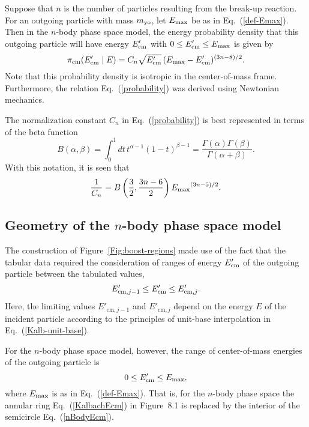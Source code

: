 Suppose that $n$ is the number of particles resulting from the break-up
reaction.  For an outgoing particle with mass $m_{\text{yo}}$,
let $E_{\text{max}}$ be as in Eq.~(\ref{def-Emax}).
Then in the $n$-body phase space model, the energy probability density 
that this outgoing particle will have energy $E_{\text{cm}}'$ with $0 \le E_{\text{cm}}' \le E_{\text{max}}$
is given by
\begin{equation}
  \pi_{\text{cm}}(E_{\text{cm}}' \mid E ) = C_n 
     \sqrt{E_{\text{cm}}'}\,
     (E_{\text{max}} - E_{\text{cm}}')^{(3n - 8)/2}.
  \label{probability}
\end{equation}
Note that this probability density is isotropic in the center-of-mass frame.
Furthermore, the relation Eq.~(\ref{probability}) was derived using Newtonian
mechanics.

The normalization constant $C_n$ in Eq.~(\ref{probability}) is best
represented in terms of the beta function
\begin{equation}
  B(\alpha, \beta) =
   \int_0^1 dt \, t^{\alpha - 1} (1 - t)^{\beta - 1} =
   \frac{\Gamma(\alpha) \Gamma(\beta)}{\Gamma( \alpha + \beta)}.
  \label{beta-func}
\end{equation}
With this notation, it is seen that
\begin{equation}
  \frac{1}{C_n} = B\left(\frac{3}{2}, \frac{3n - 6}{2} \right)
    {E_{\text{max}}}^{(3n - 5)/2}.
  \label{norm}
\end{equation}

\subsection{Geometry of the $n$-body phase space model}
The construction of Figure~\ref{Fig:boost-regions}
made use of the fact that the tabular data required the
consideration of ranges of energy $E_{\text{cm}}'$ of the outgoing particle
between the tabulated values,
\begin{equation}
  E'_{\text{cm},j-1} \le E_{\text{cm}}' \le E'_{\text{cm},j}.
  \label{KalbachEcm}
\end{equation}
Here, the limiting values $E'_{\text{cm},j-1}$ and $E'_{\text{cm},j}$
depend on the energy $E$ of the incident particle according to the
principles of unit-base interpolation in Eq.~(\ref{Kalb-unit-base}).

For the $n$-body phase space model, however, the range of
center-of-mass energies of the outgoing particle is
\begin{equation}
  0 \le E_{\text{cm}}' \le E_{\text{max}},
  \label{nBodyEcm}
\end{equation}
where $E_{\text{max}}$ is as in Eq.~(\ref{def-Emax}).  
That is, for the $n$-body phase space
the annular ring Eq.~(\ref{KalbachEcm}) in Figure~8.1 is replaced by the
interior of the semicircle Eq.~(\ref{nBodyEcm}).

